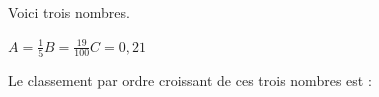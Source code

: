 
Voici trois nombres.

\smallskip

$A=\frac{1}{5}$\hfill$B=\frac{19}{100}$\hfill$C=0,21$\hfill\null

\smallskip

Le classement par ordre croissant de ces trois nombres est :

\smallskip

